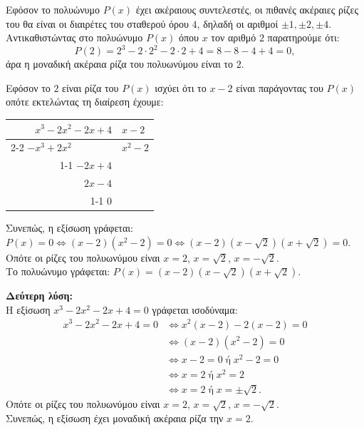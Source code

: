 \begin{alist}
\item Εφόσον το πολυώνυμο $P(x)$ έχει ακέραιους συντελεστές, οι πιθανές ακέραιες ρίζες του θα είναι οι διαιρέτες του σταθερού όρου $4$, δηλαδή οι αριθμοί $\pm 1, \pm 2, \pm 4$. \\
Αντικαθιστώντας στο πολυώνυμο $P(x)$ όπου $x$ τον αριθμό $2$ παρατηρούμε ότι: 
\[P(2) = 2^3 - 2\cdot 2^2 - 2\cdot 2 + 4 = 8 - 8 - 4 + 4 = 0,\]
άρα η μοναδική ακέραια ρίζα του πολυωνύμου είναι το $2$.
\item Εφόσον το $2$ είναι ρίζα του $P(x)$ ισχύει ότι το $x - 2$ είναι παράγοντας του $P(x)$ οπότε εκτελώντας τη διαίρεση έχουμε:
\begin{center}
\begin{tabular}{r|l}
$x^3 - 2x^2 - 2x + 4$ & $x - 2$ \\ \cline{2-2}
$-x^3 + 2x^2 \phantom{{}- 2x + 4}$ & $x^2 - 2$ \\ \cline{1-1}
$-2x + 4$ & \\
$2x - 4$ & \\ \cline{1-1}
$0$ &
\end{tabular}
\end{center}
Συνεπώς, η εξίσωση γράφεται: $P(x) = 0 \Leftrightarrow (x-2)(x^2-2) = 0 \Leftrightarrow (x-2)(x-\sqrt{2})(x+\sqrt{2}) = 0$. \\
Οπότε οι ρίζες του πολυωνύμου είναι $x=2$, $x=\sqrt{2}$, $x=-\sqrt{2}$. \\
Το πολυώνυμο γράφεται: $P(x) = (x-2)(x-\sqrt{2})(x+\sqrt{2})$.

\textbf{Δεύτερη λύση:} \\
Η εξίσωση $x^3-2x^2-2x+4=0$ γράφεται ισοδύναμα:
\begin{align*}
x^3-2x^2-2x+4=0 &\Leftrightarrow x^2(x-2)-2(x-2)=0 \\
&\Leftrightarrow (x-2)(x^2-2)=0 \\
&\Leftrightarrow x-2=0 \;\text{ή}\; x^2-2=0 \\
&\Leftrightarrow x=2 \;\text{ή}\; x^2=2 \\
&\Leftrightarrow x=2 \;\text{ή}\; x=\pm\sqrt{2}.
\end{align*}
Οπότε οι ρίζες του πολυωνύμου είναι $x=2$, $x=\sqrt{2}$, $x=-\sqrt{2}$. \\
Συνεπώς, η εξίσωση έχει μοναδική ακέραια ρίζα την $x=2$.
\end{alist}

